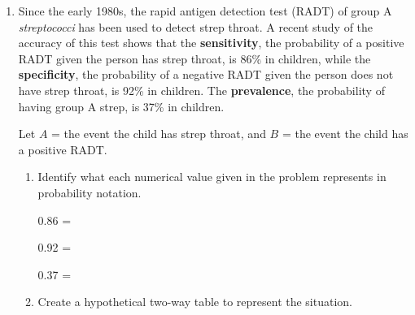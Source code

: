 \documentclass[
]{report}
\begin{document}
\begin{enumerate}
\def\labelenumi{\arabic{enumi}.}
\setcounter{enumi}{1}
\item
  Since the early 1980s, the rapid antigen detection test (RADT) of group A \emph{streptococci} has been used to detect strep throat. A recent study of the accuracy of this test shows that the \textbf{sensitivity}, the probability of a positive RADT given the person has strep throat, is 86\% in children, while the \textbf{specificity}, the probability of a negative RADT given the person does not have strep throat, is 92\% in children. The \textbf{prevalence}, the probability of having group A strep, is 37\% in children.
  \vspace{1mm}

  Let \(A\) = the event the child has strep throat, and \(B\) = the event the child has a positive RADT.
  \vspace{0.1in}

  \begin{enumerate}
  \def\labelenumii{\alph{enumii}.}
  \item
    Identify what each numerical value given in the problem represents in probability notation.
    \vspace{.1in}

    0.86 =\\
    \vspace{.1in}

    0.92 =\\
    \vspace{.1in}

    0.37 =\\
    \vspace{.1in}
  \item
    Create a hypothetical two-way table to represent the situation.\\


\end{enumerate}
\end{enumerate}
\end{document}

